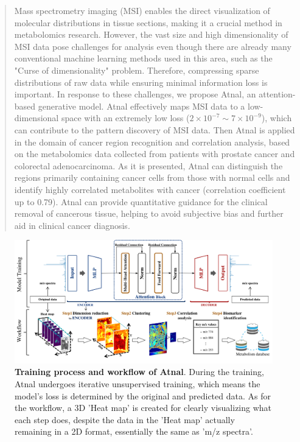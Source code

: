 \documentclass{WileyMSP-template}
\begin{document}
\begin{abstract}
Mass spectrometry imaging (MSI) enables the direct 
visualization of molecular distributions in tissue sections, 
making it a crucial method in metabolomics research. 
However, the vast size and high dimensionality of MSI data  pose challenges 
for analysis even though there are already many 
conventional machine learning methods used in this area, such as the 
"Curse of dimensionality" problem. 
Therefore, compressing sparse distributions of raw data 
while ensuring minimal information loss 
is important.   
In response to these challenges, 
we propose Atnal, an attention-based generative model. 
Atnal effectively maps MSI data to a low-dimensional 
space with an extremely low loss ($2 \times 10^{-7} \sim 7 \times 10^{-9}$), 
which can contribute to the pattern discovery of MSI data. 
Then Atnal is applied in the domain of cancer region recognition 
and correlation analysis, based on the metabolomics 
data collected from patients with prostate cancer and colorectal adenocarcinoma. 
As it is presented, 
Atnal can distinguish 
the regions primarily containing cancer 
cells from those with normal cells and 
identify highly correlated metabolites with cancer 
(correlation coefficient up to 0.79). 
Atnal can provide quantitative guidance for the clinical removal of cancerous tissue, 
helping to avoid subjective bias 
and further aid in clinical cancer diagnosis. 
\end{abstract} 
\begin{figure}[ht!]
  \centering
  \includegraphics[width=\textwidth]{./pic/workflow.png}
  \captionsetup{justification=raggedright,singlelinecheck=false}
  \caption
    {
      \textbf{Training process and workflow of Atnal}. 
      During the training, 
      Atnal undergoes iterative unsupervised training,  
      which means the model's loss is 
      determined by the original and predicted data. 
      As for the workflow, 
      a 3D 'Heat map' is created 
      for clearly visualizing what each step does, despite 
      the data in the 'Heat map' actually remaining 
      in a 2D format, essentially the same as 'm/z spectra'.  
    }
  \label{fig:Atnal woskflow}
\end{figure} 
\end{document}
